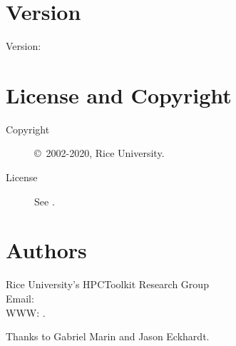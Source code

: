 \documentclass[english]{article}
\begin{document}
\section{Version}

Version: \Version

\section{License and Copyright}

\begin{description}
\item[Copyright] \copyright\ 2002-2020, Rice University.
\item[License] See .
\end{description}

\section{Authors}

\noindent
Rice University's HPCToolkit Research Group \\
Email:  \\
WWW: .

Thanks to Gabriel Marin and Jason Eckhardt.

\LatexManEnd
\end{document}
